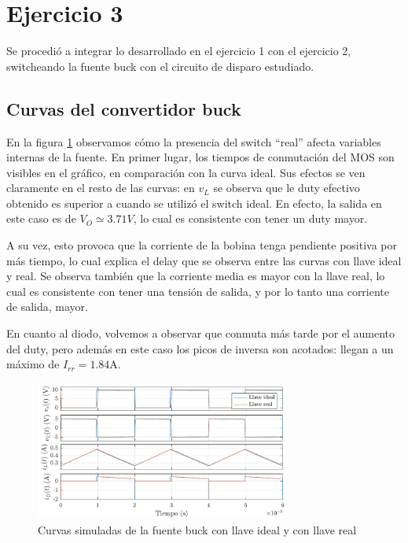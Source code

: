\documentclass[e4_tp1_main.tex]{subfiles}
\begin{document}
\section{Ejercicio 3}

Se procedi\'o a integrar lo desarrollado en el ejercicio 1 con el ejercicio 2, switcheando la fuente buck con el circuito de disparo estudiado. 

\subsection{Curvas del convertidor buck}

En la figura \ref{fig:curvas3} observamos c\'omo la presencia del switch ``real'' afecta variables internas de la fuente. En primer lugar, los tiempos de conmutaci\'on del MOS son visibles en el gr\'afico, en comparaci\'on con la curva ideal. Sus efectos se ven claramente en el resto de las curvas: en $v_L$ se observa que le duty efectivo obtenido es superior a cuando se utiliz\'o el switch ideal. En efecto, la salida en este caso es de $V_O\simeq3.71V$, lo cual es consistente con tener un duty mayor.

A su vez, esto provoca que la corriente de la bobina tenga pendiente positiva por m\'as tiempo, lo cual explica el delay que se observa entre las curvas con llave ideal y real. Se observa tambi\'en que la corriente media es mayor con la llave real, lo cual es consistente con tener una tensi\'on de salida, y por lo tanto una corriente de salida, mayor.

En cuanto al diodo, volvemos a observar que conmuta m\'as tarde por el aumento del duty, pero adem\'as en este caso los picos de inversa son acotados: llegan a un m\'aximo de $I_{rr}=1.84$A.

\begin{figure}[ht]
	\centering
	\includegraphics[width=0.75\textwidth]{images/ej3/curvas3.pdf}
	\caption{Curvas simuladas de la fuente buck con llave ideal y con llave real}
	\label{fig:curvas3}
\end{figure}
\end{document}
